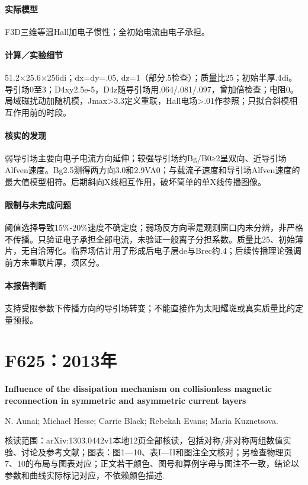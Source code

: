 \documentclass[UTF8,a4paper,11pt,openany,fontset=fandol]{ctexbook}
\begin{document}
\paragraph{实际模型}F3D三维等温Hall加电子惯性；全初始电流由电子承担。

\paragraph{计算／实验细节}51.2×25.6×256di；dx=dy=.05, dz=1（部分.5检查）；质量比25；初始半厚.4di。导引场0至3；D4xy2.5e-5，D4z随导引场用.064/.081/.097，曾加倍检查；电阻0。局域磁扰动加随机模，Jmax>3.3定义重联，Hall电场>.01作参照；只拟合斜模相互作用前的时段。

\paragraph{核实的发现}弱导引场主要向电子电流方向延伸；较强导引场约Bg/B0≥2呈双向、近导引场Alfven速度。Bg2.5测得两方向3.0和2.9VA0；与载流子速度和导引场Alfven速度的最大值模型相符。后期斜向X线相互作用，破坏简单的单X线传播图像。

\paragraph{限制与未完成问题}阈值选择导致15\%-20\%速度不确定度；弱场反方向零是观测窗口内未分辨，非严格不传播。只验证电子承担全部电流，未验证一般离子分担系数。质量比25、初始薄片，无自洽薄化。临界场估计用了形成后电子层de与Brec约.4；后续传播理论强调前方未重联片厚，须区分。

\paragraph{本报告判断}支持受限参数下传播方向的导引场转变；不能直接作为太阳耀斑或真实质量比的定量预报。

\section{F625：2013年}\label{paper:F625}

\textbf{Influence of the dissipation mechanism on collisionless magnetic reconnection in symmetric and asymmetric current layers}\citep{F625}\

N. Aunai;  Michael Hesse;  Carrie Black;  Rebekah Evans;  Maria Kuznetsova.

\textsf{核读范围：}arXiv:1303.0442v1本地12页全部核读，包括对称/非对称两组数值实验、讨论及参考文献；\textsf{图表：}图1—10、表I—II和图注全文核对；另检查物理页7、10的布局与图表对应；正文若干颜色、图号和算例字母与图注不一致，结论以参数和曲线实际标记对应，不依赖颜色描述.
\end{document}
